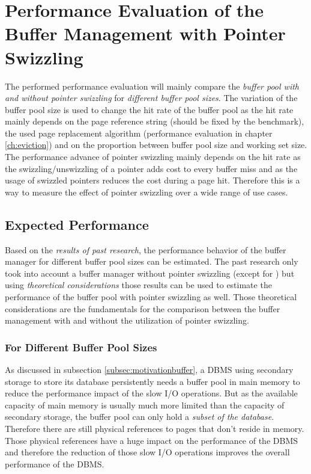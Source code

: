 \chapter[Performance Evaluation of Pointer Swizzling]{Performance Evaluation of the Buffer Management with Pointer Swizzling} \label{ch:performance}

	The performed performance evaluation will mainly compare the \emph{buffer pool with and without pointer swizzling} for \emph{different buffer pool sizes}. The variation of the buffer pool size is used to change the hit rate of the buffer pool as the hit rate mainly depends on the page reference string (should be fixed by the benchmark), the used page replacement algorithm (performance evaluation in chapter \ref{ch:eviction}) and on the proportion between buffer pool size and working set size. The performance advance of pointer swizzling mainly depends on the hit rate as the swizzling/unswizzling of a pointer adds cost to every buffer miss and as the usage of swizzled pointers reduces the cost during a page hit. Therefore this is a way to measure the effect of pointer swizzling over a wide range of use cases.
	
\section{Expected Performance}
	
	Based on the \emph{results of past research}, the performance behavior of the buffer manager for different buffer pool sizes can be estimated. The past research only took into account a buffer manager without pointer swizzling (except for \cite{Graefe:2014}) but using \emph{theoretical considerations} those results can be used to estimate the performance of the buffer pool with pointer swizzling as well. Those theoretical considerations are the fundamentals for the comparison between the buffer management with and without the utilization of pointer swizzling.
	
\subsection{For Different Buffer Pool Sizes} \label{subsec:reasonhitrate}

	As discussed in subsection \ref{subsec:motivationbuffer}, a DBMS using secondary storage to store its database persistently needs a buffer pool in main memory to reduce the performance impact of the slow I/O operations. But as the available capacity of main memory is usually much more limited than the capacity of secondary storage, the buffer pool can only hold a \emph{subset of the database}. Therefore there are still physical references to pages that don't reside in memory. Those physical references have a huge impact on the performance of the DBMS and therefore the reduction of those slow I/O operations improves the overall performance of the DBMS.
	
